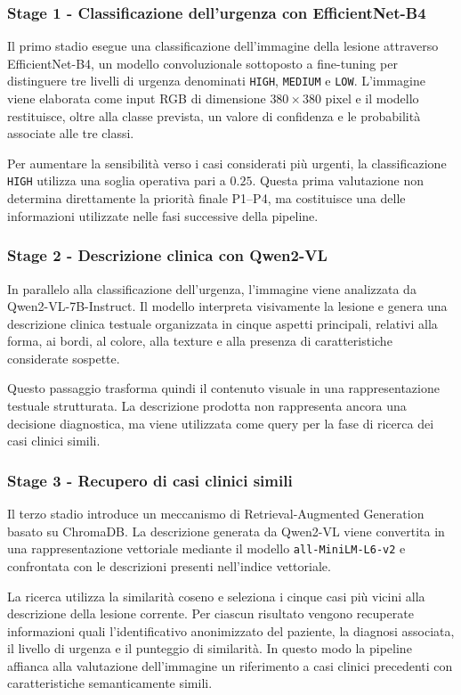 \subsubsection{Stage 1 - Classificazione dell'urgenza con EfficientNet-B4}
Il primo stadio esegue una classificazione dell'immagine della lesione attraverso EfficientNet-B4, un modello convoluzionale sottoposto a fine-tuning per distinguere tre livelli di urgenza denominati \texttt{HIGH}, \texttt{MEDIUM} e \texttt{LOW}. L'immagine viene elaborata come input RGB di dimensione $380 \times 380$ pixel e il modello restituisce, oltre alla classe prevista, un valore di confidenza e le probabilità
associate alle tre classi.

Per aumentare la sensibilità verso i casi considerati più urgenti, la classificazione \texttt{HIGH} utilizza una soglia operativa pari a $0.25$. Questa prima valutazione non determina direttamente la priorità finale P1--P4, ma costituisce una delle informazioni utilizzate nelle fasi successive della pipeline.

\subsubsection{Stage 2 - Descrizione clinica con Qwen2-VL}
In parallelo alla classificazione dell'urgenza, l'immagine viene analizzata da Qwen2-VL-7B-Instruct. Il modello interpreta visivamente la lesione e genera una descrizione clinica testuale organizzata in cinque aspetti principali, relativi alla forma, ai bordi, al colore, alla texture e alla presenza di caratteristiche considerate sospette.

Questo passaggio trasforma quindi il contenuto visuale in una rappresentazione testuale strutturata. La descrizione prodotta non rappresenta ancora una decisione diagnostica, ma viene utilizzata come query per la fase di ricerca dei casi clinici simili.

\subsubsection{Stage 3 - Recupero di casi clinici simili}
Il terzo stadio introduce un meccanismo di Retrieval-Augmented Generation basato su ChromaDB. La descrizione generata da Qwen2-VL viene convertita in una rappresentazione vettoriale mediante il modello \texttt{all-MiniLM-L6-v2} e confrontata con le descrizioni presenti nell'indice vettoriale.

La ricerca utilizza la similarità coseno e seleziona i cinque casi più vicini alla descrizione della lesione corrente. Per ciascun risultato vengono recuperate informazioni quali l'identificativo anonimizzato del paziente, la diagnosi associata, il livello di urgenza e il punteggio di similarità. In questo modo la pipeline affianca alla valutazione dell'immagine un riferimento a casi clinici precedenti con caratteristiche semanticamente simili.

